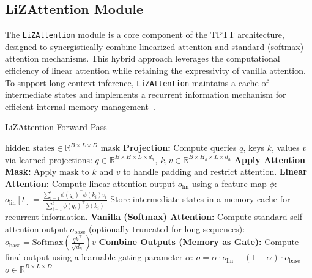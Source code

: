 \documentclass[10pt,a4paper]{article}
\begin{document}
\subsection{LiZAttention Module}

The \texttt{LiZAttention} module is a core component of the TPTT architecture, designed to synergistically combine linearized attention and standard (softmax) attention mechanisms. This hybrid approach leverages the computational efficiency of linear attention while retaining the expressivity of vanilla attention. To support long-context inference, \texttt{LiZAttention} maintains a cache of intermediate states and implements a recurrent information mechanism for efficient internal memory management~\cite{katharopoulos2020transformers}.

\begin{algorithm}[H]
\caption{LiZAttention Forward Pass}
\label{alg:lizattention}
\begin{algorithmic}[1]
\Require $\text{hidden\_states} \in \mathbb{R}^{B \times L \times D}$ 
\Require $\text{mask}$ 
\State \textbf{Projection:}
    \Statex \hspace{1em} Compute queries $q$, keys $k$, values $v$ via learned projections:
    \Statex \hspace{1em} $q \in \mathbb{R}^{B \times H \times L \times d_h}$, $k, v \in \mathbb{R}^{B \times H_k \times L \times d_h}$
\State \textbf{Apply Attention Mask:}
    \Statex \hspace{1em} Apply $\text{mask}$ to $k$ and $v$ to handle padding and restrict attention.
\State \textbf{Linear Attention:}
    \Statex \hspace{1em} Compute linear attention output $o_{\mathrm{lin}}$ using a feature map $\phi$:
    \Statex \hspace{1em} $o_{\mathrm{lin}}[t] = \frac{\sum_{i=1}^{t} \phi(q_t)^\top \phi(k_i) v_i}{\sum_{i=1}^{t} \phi(q_t)^\top \phi(k_i)}$
    \Statex \hspace{1em} Store intermediate states in a memory cache for recurrent information.
\State \textbf{Vanilla (Softmax) Attention:}
    \Statex \hspace{1em} Compute standard self-attention output $o_{\mathrm{base}}$ (optionally truncated for long sequences):
    \Statex \hspace{1em} $o_{\mathrm{base}} = \text{Softmax}\left(\frac{q k^\top}{\sqrt{d_h}}\right) v$
\State \textbf{Combine Outputs (Memory as Gate):}
    \Statex \hspace{1em} Compute final output using a learnable gating parameter $\alpha$:
    \Statex \hspace{1em} $o = \alpha \cdot o_{\mathrm{lin}} + (1-\alpha) \cdot o_{\mathrm{base}}$
\State \Return $o \in \mathbb{R}^{B \times L \times D}$
\end{algorithmic}
\end{algorithm}
\end{document}
